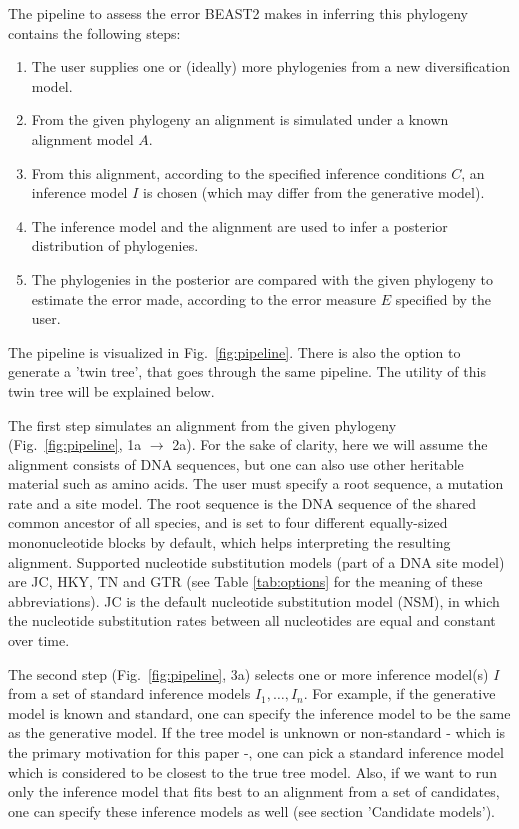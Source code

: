 The pipeline to assess the error BEAST2 makes in inferring this phylogeny 
contains the following steps:
\begin{enumerate}
  \item The user supplies one or (ideally) more phylogenies from a 
    new diversification model.
  \item From the given phylogeny an alignment is simulated 
    under a known alignment model $\mathit{A}$.
  \item From this alignment, according to the specified 
    inference conditions $\mathit{C}$, 
    an inference model $\mathit{I}$ is chosen (which may differ from the 
    generative model).
  \item The inference model and the alignment are used 
    to infer a posterior distribution of phylogenies.
  \item The phylogenies in the posterior are compared with the given phylogeny 
    to estimate the error made, according to 
    the error measure $\mathit{E}$ specified by the user.
\end{enumerate}

The pipeline is visualized in Fig.~\ref{fig:pipeline}. 
There is also the option to generate a 'twin tree', 
that goes through the same pipeline. 
The utility of this twin tree will be explained below.

The first step simulates an alignment from the given 
phylogeny (Fig.~\ref{fig:pipeline}, 1a $\rightarrow$ 2a).
For the sake of clarity, here we will assume the alignment consists
of DNA sequences, but one can also use other heritable material such as amino acids.
The user must specify a root sequence, a mutation rate and a site model.
The root sequence is the DNA sequence of the shared common ancestor of 
all species, and is set to four different equally-sized 
mononucleotide blocks by default, 
which helps interpreting the resulting alignment.
Supported nucleotide substitution models (part of a DNA
site model) are JC, HKY, TN and GTR (see Table \ref{tab:options} for
the meaning of these abbreviations).
JC is the default nucleotide substitution model (NSM),
in which the nucleotide substitution rates between all
nucleotides are equal and constant over time.

The second step (Fig.~\ref{fig:pipeline}, 3a)
selects one or more inference model(s) $I$ from 
a set of standard inference models $I_{1},\dots,I_{n}$.
For example, if the generative model is known and standard,
one can specify the inference model to be the same as the generative model.
If the tree model is unknown or non-standard - which is the primary motivation for this paper -, one can pick
a standard inference model which is considered to be closest to the true tree model.
Also, if we want to run only the inference
model that fits best to an alignment from a set of candidates,
one can specify these inference models as 
well (see section 'Candidate models').

